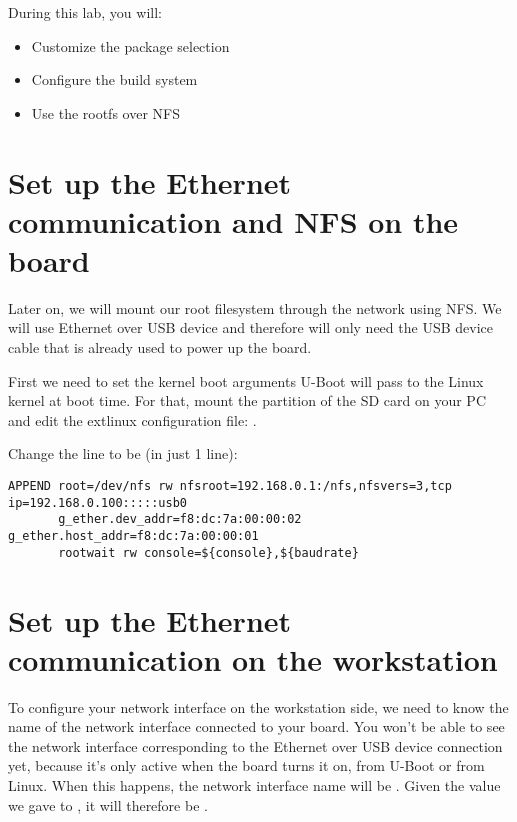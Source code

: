 
During this lab, you will:
\begin{itemize}
  \item Customize the package selection
  \item Configure the build system
  \item Use the rootfs over NFS
\end{itemize}

\section{Set up the Ethernet communication and NFS on the board}

Later on, we will mount our root filesystem through the network using
NFS. We will use Ethernet over USB device and therefore will only need
the USB device cable that is already used to power up the board.

First we need to set the kernel boot arguments U-Boot will pass to the
Linux kernel at boot time. For that, mount the  partition
of the SD card on your PC and edit the extlinux configuration file:
.

Change the  line to be (in just 1 line):

{\small
\begin{verbatim}
APPEND root=/dev/nfs rw nfsroot=192.168.0.1:/nfs,nfsvers=3,tcp ip=192.168.0.100:::::usb0
       g_ether.dev_addr=f8:dc:7a:00:00:02 g_ether.host_addr=f8:dc:7a:00:00:01
       rootwait rw console=${console},${baudrate}
\end{verbatim}
}

\section{Set up the Ethernet communication on the workstation}

To configure your network interface on the workstation side, we need
to know the name of the network interface connected to your board. You
won't be able to see the network interface corresponding to the
Ethernet over USB device connection yet, because it's only active when
the board turns it on, from U-Boot or from Linux. When this happens,
the network interface name will be . Given the
value we gave to , it will therefore be
.

